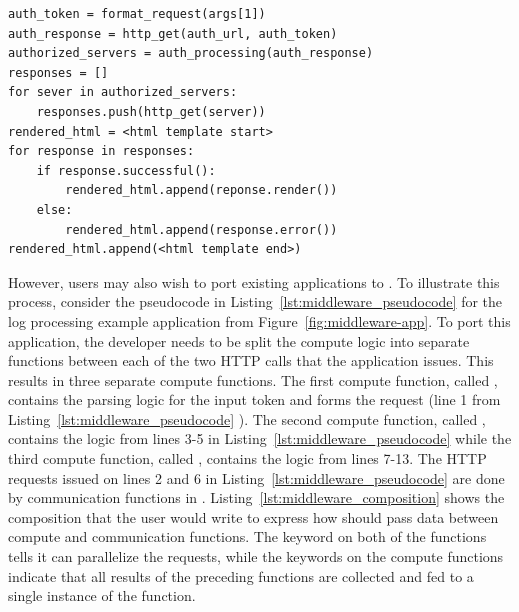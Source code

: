 \begin{lstlisting}[basicstyle=\ttfamily, style=codestyle, caption={Pseudocode for log processing application.},captionpos=b, label={lst:middleware_pseudocode}, float=t]
auth_token = format_request(args[1])
auth_response = http_get(auth_url, auth_token)
authorized_servers = auth_processing(auth_response)
responses = []
for sever in authorized_servers:
    responses.push(http_get(server))
rendered_html = <html template start>
for response in responses:
    if response.successful():
        rendered_html.append(reponse.render())
    else:
        rendered_html.append(response.error())
rendered_html.append(<html template end>)
\end{lstlisting}

However, users may also wish to port existing applications to \dandelion.
To illustrate this process, consider the  pseudocode in Listing~\ref{lst:middleware_pseudocode} for the log processing example application from Figure~\ref{fig:middleware-app}.
To port this application, the developer needs to be split the compute logic into separate functions between each of the two HTTP calls that the application issues. This results in three separate compute functions.
The first compute function, called \texttt{\color{computation}{Access}}, contains the parsing logic for the input token and forms the request (line 1 from Listing~\ref{lst:middleware_pseudocode} ).
The second compute function, called \texttt{\color{computation}{FanOut}}, contains the logic from lines 3-5 in Listing~\ref{lst:middleware_pseudocode} while the third compute function, called \texttt{\color{computation}{Render}}, contains the logic from lines 7-13. 
The HTTP requests issued on lines 2 and 6 in Listing~\ref{lst:middleware_pseudocode} are done by communication functions in \dandelion.
Listing~\ref{lst:middleware_composition} shows the composition that the user would write to express how \dandelion should pass data between compute and communication functions.
The \texttt{\color{blue}{each}} keyword on both of the \texttt{\color{communication}{HTTP}} functions tells \dandelion it can parallelize the requests, while the \texttt{\color{blue}{all}} keywords on the compute functions indicate that all results of the preceding functions are collected and fed to a single instance of the function.

